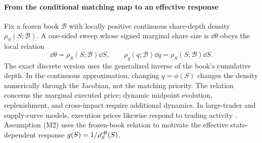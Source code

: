 \documentclass[review,hidelinks,onefignum,onetabnum]{siamonline250211}
\begin{document}
\paragraph{From the conditional matching map to an effective response} Fix a frozen book $\mathcal B$ with locally positive continuous share-depth density $\rho_S(S;\mathcal B)$. A one-sided sweep whose signed marginal share size is $\dd\theta$ obeys the local relation
\begin{equation}\label{eq:frozen-depth}
\dd\theta=\rho_S(S;\mathcal B)\dd S,
\qquad \rho_q(q;\mathcal B)\dd q=\rho_S(S;\mathcal B)\dd S.
\end{equation}
The exact discrete version uses the generalized inverse of the book's cumulative depth. In the continuous approximation, changing $q=\phi(S)$ changes the density numerically through the Jacobian, not the matching priority. The relation concerns the marginal executed price; dynamic midpoint evolution, replenishment, and cross-impact require additional dynamics. In large-trader and supply-curve models, execution prices likewise respond to trading activity \citep{BankBaum2004,CetinJarrowProtter2004}. Assumption (M2) uses the frozen-book relation to motivate the effective state-dependent response $g(S)=1/\rho_S^{\rm eff}(S)$.
\end{document}
